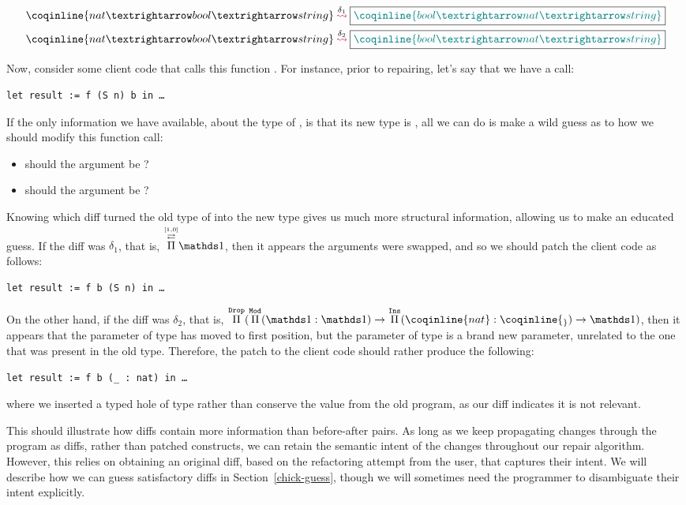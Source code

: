 \begin{align*}
\MathPatches
{\coqinline{nat → bool → string}}
{\delta_{1}}
{\coqinline{bool → nat → string}}\\
\MathPatches
{\coqinline{nat → bool → string}}
{\delta_{2}}
{\coqinline{bool → nat → string}}
\end{align*}

Now, consider some client code that calls this function .  For
instance, prior to repairing, let's say that we have a call:

\begin{verbatim}
let result := f (S n) b in …
\end{verbatim}

If the only information we have available, about the type of , is
that its new type is , all we can do is make a
wild guess as to how we should modify this function call:

\begin{itemize}
\item should the  argument be ?
\item should the  argument be ?
\end{itemize}

Knowing which diff turned the old type of  into the new type gives
us much more structural information, allowing us to make an educated guess.  If
the diff was $\delta_{1}$, that is, $\MathPermutePis{[1, 0]}{\MathSame{}}$, then
it appears the arguments were swapped, and so we should patch the client code as
follows:

\begin{verbatim}
let result := f b (S n) in …
\end{verbatim}

\noindent%
%
On the other hand, if the diff was $\delta_{2}$, that is,
$\MathDropPi{(\MathModPi{\MathSame{}}{\MathSame{}}
{\MathInsPi{\coqinline{_}}{\coqinline{nat}}{\MathSame{}}})}$, then it appears
that the parameter of type  has moved to first position, but the
parameter of type  is a brand new parameter, unrelated to the one
that was present in the old type.  Therefore, the patch to the client code
should rather produce the following:

\begin{verbatim}
let result := f b (_ : nat) in …
\end{verbatim}

\noindent where we inserted a typed hole of type  rather than
conserve the value  from the old program, as our diff indicates
it is not relevant.

This should illustrate how diffs contain more information than before-after
pairs.  As long as we keep propagating changes through the program as diffs,
rather than patched constructs, we can retain the semantic intent of the changes
throughout our repair algorithm.  However, this relies on obtaining an original
diff, based on the refactoring attempt from the user, that captures their
intent.  We will describe how we can guess satisfactory diffs in
Section~\ref{chick-guess}, though we will sometimes need the programmer to
disambiguate their intent explicitly.
